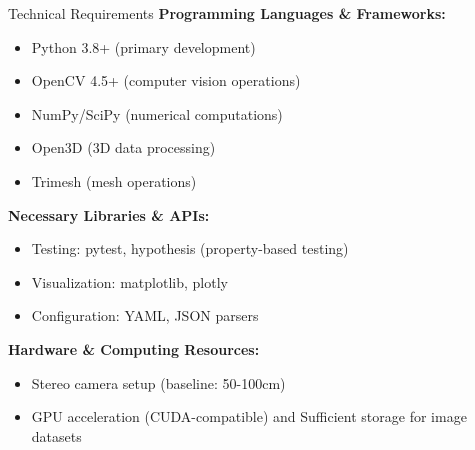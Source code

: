 \documentclass[aspectratio=169]{beamer}
\begin{document}
\begin{frame}{Technical Requirements}
\textbf{Programming Languages \& Frameworks:}
\begin{itemize}
\item Python 3.8+ (primary development)
\item OpenCV 4.5+ (computer vision operations)
\item NumPy/SciPy (numerical computations)
\item Open3D (3D data processing)
\item Trimesh (mesh operations)
\end{itemize}

\vspace{0.5cm}

\textbf{Necessary Libraries \& APIs:}
\begin{itemize}
\item Testing: pytest, hypothesis (property-based testing)
\item Visualization: matplotlib, plotly
\item Configuration: YAML, JSON parsers
\end{itemize}

\vspace{0.5cm}

\textbf{Hardware \& Computing Resources:}
\begin{itemize}
\item Stereo camera setup (baseline: 50-100cm)
\item GPU acceleration (CUDA-compatible) and Sufficient storage for image datasets
\end{itemize}
\end{frame}
\end{document}
